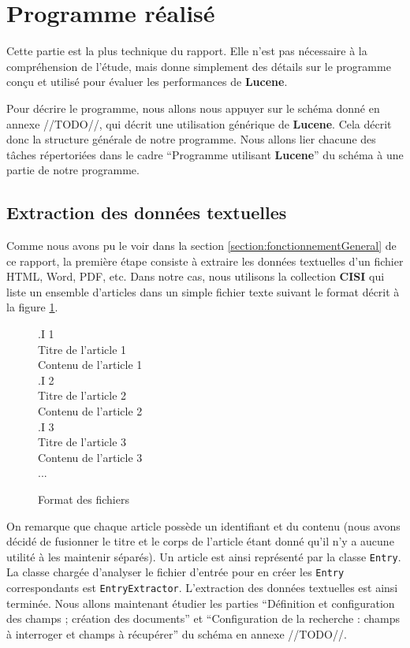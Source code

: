 \section{Programme réalisé}

Cette partie est la plus technique du rapport. Elle n’est pas nécessaire à la compréhension de l’étude, mais donne simplement des détails sur le programme conçu et utilisé pour évaluer les performances de \textbf{Lucene}.

Pour décrire le programme, nous allons nous appuyer sur le schéma donné en annexe //TODO//, qui décrit une utilisation générique de \textbf{Lucene}. Cela décrit donc la structure générale de notre programme. Nous allons lier chacune des tâches répertoriées dans le cadre “Programme utilisant \textbf{Lucene}” du schéma à une partie de notre programme.

\subsection{Extraction des données textuelles}

Comme nous avons pu le voir dans la section \ref{section:fonctionnementGeneral} de ce rapport, la première étape consiste à extraire les données textuelles d’un fichier HTML, Word, PDF, etc. Dans notre cas, nous utilisons la collection \textbf{CISI} qui liste un ensemble d’articles dans un simple fichier texte suivant le format décrit à la figure \ref{formatTexte}.


 \begin{figure}[h]
 .I 1\\
 Titre de l’article 1\\
 Contenu de l’article 1\\
 .I 2\\
 Titre de l’article 2\\
 Contenu de l’article 2\\
 .I 3\\
 Titre de l’article 3\\
 Contenu de l’article 3\\
 ...
            \caption{Format des fichiers}
            \label{formatTexte}
 \end{figure}

On remarque que chaque article possède un identifiant et du contenu (nous avons décidé de fusionner le titre et le corps de l’article étant donné qu’il n’y a aucune utilité à les maintenir séparés). Un article est ainsi représenté par la classe \texttt{Entry}. La classe chargée d’analyser le fichier d’entrée pour en créer les \texttt{Entry} correspondants est \texttt{EntryExtractor}.
L’extraction des données textuelles est ainsi terminée. Nous allons maintenant étudier les parties “Définition et configuration des champs ; création des documents” et “Configuration de la recherche : champs à interroger et champs à récupérer” du schéma en annexe //TODO//.

